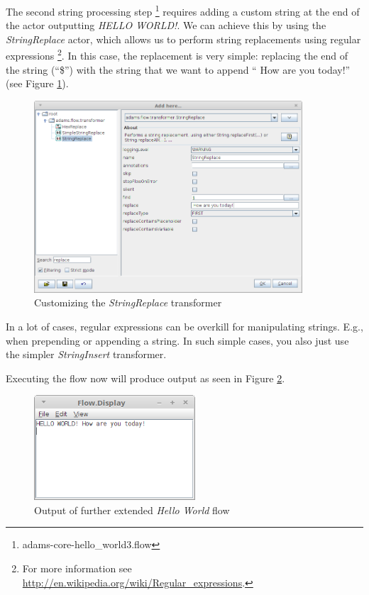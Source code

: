 The second string processing step \footnote{adams-core-hello\_world3.flow}
requires adding a custom string at the end of the actor outputting \textit{HELLO
WORLD!}. We can achieve this by using the \textit{StringReplace} actor, which allows us to perform string replacements
using regular expressions \footnote{For more information see
\url{http://en.wikipedia.org/wiki/Regular_expressions}{}.}. In this case, the
replacement is very simple: replacing the end of the string (``\$'') with the
string that we want to append `` How are you today!'' (see Figure
\ref{floweditor-helloworld-processdata6}).

\begin{figure}[htb]
  \centering
  \includegraphics[width=10.0cm]{images/floweditor-helloworld-processdata6.png}
  \caption{Customizing the \textit{StringReplace} transformer}
  \label{floweditor-helloworld-processdata6}
\end{figure}

In a lot of cases, regular expressions can be overkill for manipulating strings.
E.g., when prepending or appending a string. In such simple cases, you also
just use the simpler \textit{StringInsert} transformer.

Executing the flow now will produce output as seen in Figure
\ref{floweditor-helloworld-processdata7}.

\begin{figure}[htb]
  \centering
  \includegraphics[width=6.0cm]{images/floweditor-helloworld-processdata7.png}
  \caption{Output of further extended \textit{Hello World} flow}
  \label{floweditor-helloworld-processdata7}
\end{figure}

